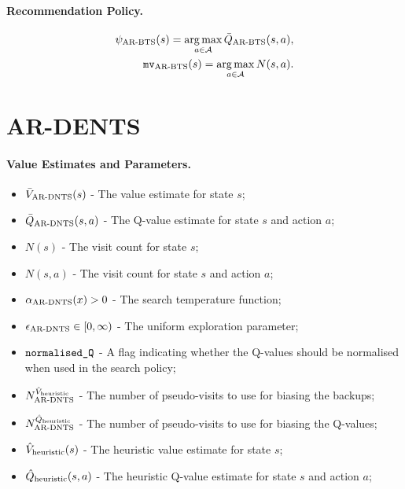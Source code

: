     \paragraph{Recommendation Policy.}
        \begin{align}
            {\psi_{{\textnormal{AR-BTS}}}}(s)=\operatorname*{arg\,max}_{a\in\mathcal{A}}{\bar{Q}_{{\textnormal{AR-BTS}}}}(s,a),  \\
            {\textup{\texttt{mv}}_{{\textnormal{AR-BTS}}}}(s) = \operatorname*{arg\,max}_{a\in\mathcal{A}} N(s,a). 
        \end{align}




\section{AR-DENTS}
\label{appsec:4:ar-dents-ref}

    \paragraph{Value Estimates and Parameters.}

        \begin{itemize}
            \item ${\bar{V}_{{\textnormal{AR-DNTS}}}}(s)$ - The value estimate for state $s$;
            \item ${\bar{Q}_{{\textnormal{AR-DNTS}}}}(s,a)$ - The Q-value estimate for state $s$ and action $a$;
            \item $N(s)$ - The visit count for state $s$;
            \item $N(s,a)$ - The visit count for state $s$ and action $a$;
            \item ${\alpha_{{\textnormal{AR-DNTS}}}}(x)>0$ - The search temperature function;
            \item ${\epsilon_{{\textnormal{AR-DNTS}}}} \in [0,\infty)$ - The uniform exploration parameter;
            \item ${\textnormal{\texttt{normalised\_Q}}}$ - A flag indicating whether the Q-values should be normalised when used in the search policy;
            \item $N^{{\hat{V}_{\textnormal{heuristic}}}}_{{\textnormal{AR-DNTS}}}$ - The number of pseudo-visits to use for biasing the backups;
            \item $N^{{\hat{Q}_{\textnormal{heuristic}}}}_{{\textnormal{AR-DNTS}}}$ - The number of pseudo-visits to use for biasing the Q-values;
            \item ${\hat{V}_{\textnormal{heuristic}}}(s)$ - The heuristic value estimate for state $s$;
            \item ${\hat{Q}_{\textnormal{heuristic}}}(s,a)$ - The heuristic Q-value estimate for state $s$ and action $a$;
        \end{itemize}

